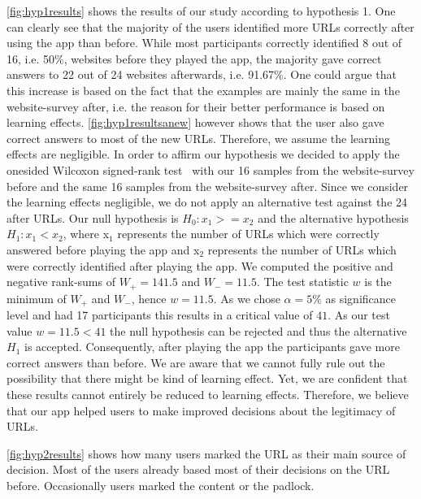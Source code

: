 \begin{description}[leftmargin=0cm]
\item[Hypothesis 1:]
\autoref{fig:hyp1results} shows the results of our study according to hypothesis 1. One can clearly see that the majority of the users identified more URLs correctly after using the app than before. While most participants correctly identified 8 out of 16, i.e. 50\%, websites before they played the app, the majority gave correct answers to 22 out of 24 websites afterwards, i.e. 91.67\%. One could argue that this increase is based on the fact that the examples are mainly the same in the website-survey after, i.e. the reason for their better performance is based on learning effects. \autoref{fig:hyp1resultsanew} however shows that the user also gave correct answers to most of the new URLs. Therefore, we assume the learning effects are negligible.
In order to affirm our hypothesis we decided to apply the onesided Wilcoxon signed-rank test~\cite{wilcoxon1945individual} with our 16 samples from the website-survey before and the same 16 samples from the website-survey after.
Since we consider the learning effects negligible, we do not apply an alternative test against the 24 after URLs.
Our null hypothesis is $H_{0}: x_{1} >= x_{2}$ and the alternative hypothesis $H_{1}: x_{1} < x_{2}$, where x$_{1}$ represents the number of URLs which were correctly answered before playing the app and x$_{2}$ represents the number of URLs which were correctly identified after playing the app.
We computed the positive and negative rank-sums of $W_{+} = 141.5$ and $W_{-} = 11.5$.
The test statistic $w$ is the minimum of $W_{+}$ and $W_{-}$, hence $w = 11.5$.
As we chose $\alpha = 5\%$ as significance level and had 17 participants this results in a critical value of $41$.
As our test value $w = 11.5 < 41$ the null hypothesis can be rejected and thus the alternative $H_{1}$ is accepted.
Consequently, after playing the app the participants gave more correct answers than before.
We are aware that we cannot fully rule out the possibility that there might be kind of learning effect.
Yet, we are confident that these results cannot entirely be reduced to learning effects.
Therefore, we believe that our app helped users to make improved decisions about the legitimacy of URLs.
\item[Hypothesis 2:]
\autoref{fig:hyp2results} shows how many users marked the URL as their main source of decision.
Most of the users already based most of their decisions on the URL before.
Occasionally users marked the content or the padlock.

\end{description}
